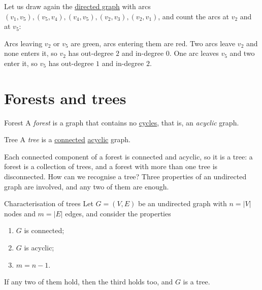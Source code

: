 \documentclass[a4paper,12pt,oneside]{report}
\begin{document}
Let us draw again the \hyperref[def:directed-graph]{directed graph}
with arcs $(v_1,v_5),(v_5,v_4),(v_4,v_5),(v_2,v_3),(v_2,v_1)$, and
count the arcs at $v_2$ and at $v_5$:
\begin{center}
\end{center}
Arcs leaving $v_2$ or $v_5$ are green, arcs entering them are red. Two
arcs leave $v_2$ and none enters it, so $v_2$ has out-degree $2$ and
in-degree $0$. One arc leaves $v_5$ and two enter it, so $v_5$ has
out-degree $1$ and in-degree $2$.

\section{Forests and trees}
\label{sec:forests-trees}

\begin{frameddefn}{Forest}\label{def:forest}
A \emph{forest} is a graph that contains no
\hyperref[def:cycle]{cycles}, that is, an \emph{acyclic} graph.
\end{frameddefn}

\begin{frameddefn}{Tree}\label{def:tree}
A \emph{tree} is a \hyperref[def:connected-graph]{connected}
\hyperref[def:forest]{acyclic} graph.
\end{frameddefn}

Each connected component of a forest is connected and acyclic, so it
is a tree: a forest is a collection of trees, and a forest with more
than one tree is disconnected. How can we recognise a tree? Three
properties of an undirected graph are involved, and any two of them
are enough.

\begin{framedthm}{Characterisation of trees}\label{thm:tree}
Let $G=(V,E)$ be an undirected graph with $n=|V|$ nodes and $m=|E|$
edges, and consider the properties
\begin{enumerate}
  \item $G$ is connected;
  \item $G$ is acyclic;
  \item $m=n-1$.
\end{enumerate}
If any two of them hold, then the third holds too, and $G$ is a tree.
\end{framedthm}
\end{document}
